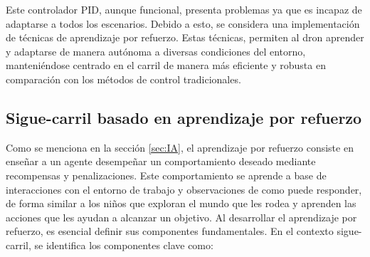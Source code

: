 Este controlador PID, aunque funcional, presenta problemas ya que es incapaz de adaptarse a todos los escenarios. Debido a esto, se considera una implementación de técnicas de aprendizaje por refuerzo. Estas técnicas, 
permiten al dron aprender y adaptarse de manera autónoma a diversas condiciones del entorno, manteniéndose centrado en el carril de manera más eficiente y robusta en comparación 
con los métodos de control tradicionales.
  \newpage
  \subsection{Sigue-carril basado en aprendizaje por refuerzo}
  \label{sec:aprendizaje por refuerzo}

  Como se menciona en la sección \ref{sec:IA}, el aprendizaje por refuerzo consiste en enseñar a un agente 
  desempeñar un comportamiento deseado mediante recompensas y penalizaciones. Este comportamiento se aprende a base de interacciones con el entorno de trabajo y observaciones de como puede responder,
  de forma similar a los niños que exploran el mundo que les rodea y aprenden las acciones que les ayudan a alcanzar un objetivo. Al desarrollar el aprendizaje por refuerzo, es esencial 
  definir sus componentes fundamentales. En el contexto sigue-carril, se identifica los componentes clave como: 
